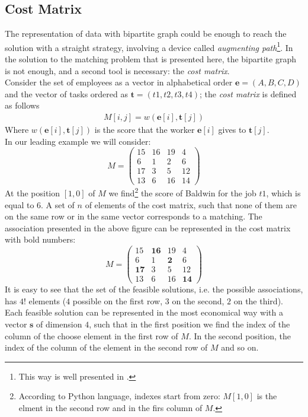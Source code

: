\documentclass[12pt]{ClasseMatematicamente}
\begin{document}
\subsection*{Cost Matrix}
The representation of data with bipartite graph could be enough to reach the solution with a straight strategy, involving a device called \emph{augmenting path}\footnote{This way is well presented in \cite{mordecai}.}. In the solution to the matching problem that is presented here, the bipartite graph is not enough, and a second tool is necessary: the \emph{cost matrix}. \\
Consider the set of employees as a vector in alphabetical order $\mathbf{e} = (A,B,C,D)$ and the vector of tasks ordered as $\mathbf{t}=(t1,t2,t3,t4)$; the \emph{cost matrix} is defined as follows
\begin{align*}
  M[i,j] = w(\mathbf{e}[i],\mathbf{t}[j]) 
\end{align*}
Where $w(\mathbf{e}[i],\mathbf{t}[j])$ is the score that the worker $\mathbf{e}[i]$ gives to $\mathbf{t}[j]$.\\
In our leading example we will consider:
\begin{equation}\label{matrix_M}
M = 
\left(\begin{array}{rrrr}
15 & 16 & 19 & 4 \\
6 & 1 & 2 & 6 \\
17 & 3 & 5 & 12 \\
13 & 6 & 16 & 14
\end{array}\right)
\end{equation}
At the position $[1,0]$ of $M$ we find\footnote{According to Python language, indexes start from zero: $M[1,0]$ is the elment in the second row and in the firs column of $M$.} the score of Baldwin for the job $t1$, which is equal to $6$. 
A set of $n$ of elements of the cost matrix, such that none of them are on the same row or in the same vector corresponds to a matching. The association presented in the above figure can be represented in the cost matrix with bold numbers:
$$
M = 
\left(\begin{array}{rrrr}
15 & \mathbf{16} & 19 & 4 \\
6 & 1 & \mathbf{2} & 6 \\
\mathbf{17} & 3 & 5 & 12 \\
13 & 6 & 16 & \mathbf{14}
\end{array}\right)
$$
It is easy to see that the set of the feasible solutions, i.e. the possible associations, has $4!$ elements ($4$ possible on the first row, $3$ on the second, $2$ on the third). Each feasible solution can be represented in the most economical way with a vector $\mathbf{s}$ of dimension $4$, such that in the first position we find the index of the column of the choose element in the first row of $M$. In the second position, the index of the column of the element in the second row of $M$ and so on.
\end{document}
